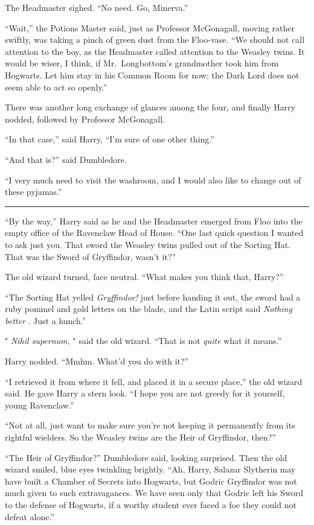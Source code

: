 The Headmaster sighed. ``No need. Go, Minerva.''

``Wait,'' the Potions Master said, just as Professor McGonagall, moving
rather swiftly, was taking a pinch of green dust from the Floo-vase.
``We should not call attention to the boy, as the Headmaster called
attention to the Weasley twins. It would be wiser, I think, if
Mr.~Longbottom's grandmother took him from Hogwarts. Let him stay in his
Common Room for now; the Dark Lord does not seem able to act so
openly.''

There was another long exchange of glances among the four, and finally
Harry nodded, followed by Professor McGonagall.

``In that case,'' said Harry, ``I'm sure of one other thing.''

``And that is?'' said Dumbledore.

``I very much need to visit the washroom, and I would also like to
change out of these pyjamas.''

\begin{center}\rule{3in}{0.4pt}\end{center}

``By the way,'' Harry said as he and the Headmaster emerged from Floo
into the empty office of the Ravenclaw Head of House. ``One last quick
question I wanted to ask just you. That sword the Weasley twins pulled
out of the Sorting Hat. That was the Sword of Gryffindor, wasn't it?''

The old wizard turned, face neutral. ``What makes you think that,
Harry?''

``The Sorting Hat yelled \emph{Gryffindor!} just before handing it out,
the sword had a ruby pommel and gold letters on the blade, and the Latin
script said \emph{Nothing better} . Just a hunch.''

" \emph{Nihil supernum,} " said the old wizard. ``That is not
\emph{quite} what it means.''

Harry nodded. ``Mmhm. What'd you do with it?''

``I retrieved it from where it fell, and placed it in a secure place,''
the old wizard said. He gave Harry a stern look. ``I hope you are not
greedy for it yourself, young Ravenclaw.''

``Not at all, just want to make sure you're not keeping it permanently
from its rightful wielders. So the Weasley twins are the Heir of
Gryffindor, then?''

``The Heir of Gryffindor?'' Dumbledore said, looking surprised. Then the
old wizard smiled, blue eyes twinkling brightly. ``Ah, Harry, Salazar
Slytherin may have built a Chamber of Secrets into Hogwarts, but Godric
Gryffindor was not much given to such extravagances. We have seen only
that Godric left his Sword to the defense of Hogwarts, if a worthy
student ever faced a foe they could not defeat alone.''

